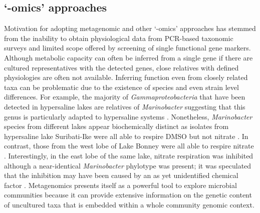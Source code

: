 \subsection{`-omics' approaches}
Motivation for adopting metagenomic and other `-omics' approaches has stemmed from the inability to obtain physiological data from \ac{PCR}-based taxonomic surveys and limited scope offered by screening of single functional gene markers.
Although metabolic capacity can often be inferred from a single gene if there are cultured representatives with the detected genes, close relatives with defined physiologies are often not available.
Inferring function even from closely related taxa can be problematic due to the existence of species and even strain level differences.
For example, the majority of \emph{Gammaproteobacteria} that have been detected in hypersaline lakes are relatives of \emph{Marinobacter} suggesting that this genus is particularly adapted to hypersaline systems \cite{Bowman2000b, Glatz2006, Matsuzaki2006, Mosier2007}.
Nonetheless, \emph{Marinobacter} species from different lakes appear biochemically distinct as isolates from hypersaline lake Suribati-Ike were all able to respire \ac{DMSO} but not nitrate \cite{Matsuzaki2006}. 
In contrast, those from the west lobe of Lake Bonney were all able to respire nitrate \cite{Ward1997}. 
Interestingly, in the east lobe of the same lake, nitrate respiration was inhibited although a near-identical \emph{Marinobacter} phylotype was present; it was speculated that the inhibition may have been caused by an as yet unidentified chemical factor \cite{Ward2005, Glatz2006}.
Metagenomics presents itself as a powerful tool to explore microbial communities because it can provide extensive information on the genetic content of uncultured taxa that is embedded within a whole community genomic context.
 
